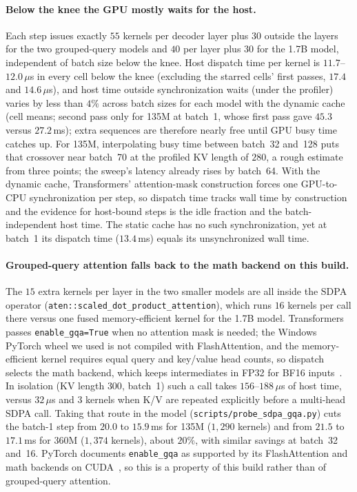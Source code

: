 \documentclass[11pt]{article}
\begin{document}
\paragraph{Below the knee the GPU mostly waits for the host.}
Each step issues exactly $55$ kernels per decoder layer plus $30$ outside the layers for the two grouped-query models and $40$ per layer plus $30$ for the 1.7B model, independent of batch size below the knee.
Host dispatch time per kernel is $11.7$--$12.0\,\mu$s in every cell below the knee (excluding the starred cells' first passes, $17.4$ and $14.6\,\mu$s), and host time outside synchronization waits (under the profiler) varies by less than $4\%$ across batch sizes for each model with the dynamic cache (cell means; second pass only for 135M at batch~1, whose first pass gave $45.3$ versus $27.2$\,ms); extra sequences are therefore nearly free until GPU busy time catches up.
For 135M, interpolating busy time between batch~32 and~128 puts that crossover near batch~70 at the profiled KV length of $280$, a rough estimate from three points; the sweep's latency already rises by batch~64.
With the dynamic cache, Transformers' attention-mask construction forces one GPU-to-CPU synchronization per step, so dispatch time tracks wall time by construction and the evidence for host-bound steps is the idle fraction and the batch-independent host time.
The static cache has no such synchronization, yet at batch~1 its dispatch time ($13.4$\,ms) equals its unsynchronized wall time.

\paragraph{Grouped-query attention falls back to the math backend on this build.}
The $15$ extra kernels per layer in the two smaller models are all inside the SDPA operator (\texttt{aten::scaled\_\allowbreak dot\_\allowbreak product\_\allowbreak attention}), which runs $16$ kernels per call there versus one fused memory-efficient kernel for the 1.7B model.
Transformers passes \texttt{enable\_gqa=True} when no attention mask is needed; the Windows PyTorch wheel we used is not compiled with FlashAttention, and the memory-efficient kernel requires equal query and key/value head counts, so dispatch selects the math backend, which keeps intermediates in FP32 for BF16 inputs~\cite{pytorchsdpa}.
In isolation (KV length $300$, batch~1) such a call takes $156$--$188\,\mu$s of host time, versus $32\,\mu$s and $3$ kernels when K/V are repeated explicitly before a multi-head SDPA call.
Taking that route in the model (\texttt{scripts/probe\_sdpa\_gqa.py}) cuts the batch-1 step from $20.0$ to $15.9$\,ms for 135M ($1{,}290$ kernels) and from $21.5$ to $17.1$\,ms for 360M ($1{,}374$ kernels), about $20\%$, with similar savings at batch~32 and~16.
PyTorch documents \texttt{enable\_gqa} as supported by its FlashAttention and math backends on CUDA~\cite{pytorchsdpa}, so this is a property of this build rather than of grouped-query attention.
\end{document}
